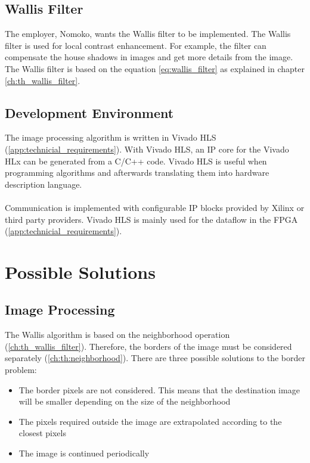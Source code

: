 \subsection{Wallis Filter} \label{chapt:mission:wallis}
The employer, Nomoko, wants the Wallis filter to be implemented. The Wallis filter is used for local contrast enhancement. For example, the filter can compensate the house shadows in images and get more details from the image. 
The Wallis filter is based on the equation \ref{eq:wallis_filter} as explained in chapter \ref{ch:th_wallis_filter}.


\subsection{Development Environment}
The image processing algorithm is written in Vivado HLS (\ref{app:technicial_requirements}). With Vivado HLS, an IP core for the Vivado HLx can be generated from a C/C++ code. Vivado HLS is useful when programming algorithms and afterwards translating them into hardware description language. \\ 
\\
Communication is implemented with configurable IP blocks provided by Xilinx or third party providers. Vivado HLS is mainly used for the dataflow in the FPGA (\ref{app:technicial_requirements}).

%
%
\section{Possible Solutions} \label{chapt:solutions}

\subsection{Image Processing} \label{chapt:mission:ip}
The Wallis algorithm is based on the neighborhood operation (\ref{ch:th_wallis_filter}). Therefore, the borders of the image must be considered separately (\ref{ch:th:neighborhood}). There are three possible solutions to the border problem:

\begin{itemize}
\item The border pixels are not considered. This means that the destination image will be smaller depending on the size of the neighborhood
\item The pixels required outside the image are extrapolated according to the closest pixels
\item The image is continued periodically
\end{itemize}

